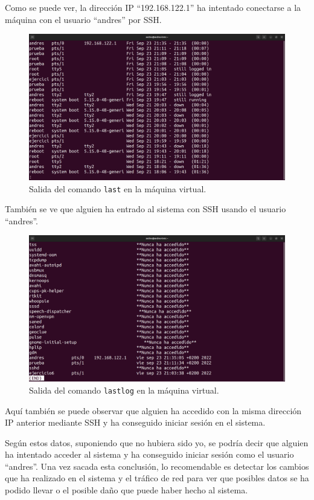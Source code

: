 \documentclass{article}
\begin{document}
Como se puede ver, la dirección IP ``192.168.122.1'' ha intentado conectarse a la máquina con el usuario ``andres'' por SSH. 

\begin{figure}[H]
    \includegraphics[width=\textwidth]{imagenes/lastip.png}
    \caption{Salida del comando \texttt{last} en la máquina virtual.}
\end{figure}

También se ve que alguien ha entrado al sistema con SSH usando el usuario ``andres''.

\begin{figure}[H]
    \includegraphics[width=\textwidth]{imagenes/lastlogip.png}
    \caption{Salida del comando \texttt{lastlog} en la máquina virtual.}
\end{figure}

Aquí también se puede observar que alguien ha accedido con la misma dirección IP anterior mediante SSH y ha conseguido iniciar sesión en el sistema.

\bigskip

Según estos datos, suponiendo que no hubiera sido yo, se podría decir que alguien ha intentado acceder al sistema y ha conseguido iniciar sesión como el usuario ``andres''. Una vez sacada esta conclusión, lo recomendable es detectar los cambios que ha realizado en el sistema y el tráfico de red para ver que posibles datos se ha podido llevar o el posible daño que puede haber hecho al sistema.
\end{document}
